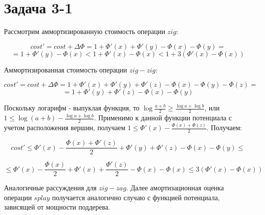 \documentclass{article}
\renewcommand{\leq}{\leqslant}  %
\renewcommand{\geq}{\geqslant}  %
\begin{document}
\section{Задача 3-1}

Рассмотрим аммортизированную стоимость операции $zig$:

$$cost' = cost + \Delta \Phi = 1 + \Phi'(x) + \Phi'(y) - \Phi(x) - \Phi(y)=$$
$$ = 1 + \Phi'(y) - \Phi(x) < 1 + \Phi'(x) - \Phi(x) < 1 + 3(\Phi'(x) - \Phi(x))$$

Аммортизированная стоимость операции $zig-zig$:

$$cost' = cost + \Delta \Phi = 1 + \Phi'(x) + \Phi'(y) + \Phi'(z) - \Phi(x) - \Phi(y) - \Phi(z)=$$
$$ =1 + \Phi'(y) + \Phi'(z) - \Phi(x) - \Phi(y)$$

Поскольку логарифм - выпуклая функция, то $\log\frac{a+b}{2} \geq \frac{\log a + \log b}{2} $, или $1 \leq \log (a+b) - \frac{\log a + \log b}{2}$. Применимо к данной функции потенциала с учетом расположения вершин, получаем $1 \leq \Phi'(x) - \frac{\Phi(x) + \Phi(z)}{2}$. Получаем:

$$cost' \leq \Phi'(x) - \frac{\Phi(x) + \Phi'(z)}{2} + \Phi'(y) + \Phi'(z) - \Phi(x) - \Phi(y) \leq $$

$$\leq \Phi'(x) - \frac{\Phi(x)}{2} + \Phi'(x) + \frac{\Phi'(z)}{2} - \Phi(x) - \Phi(x) \leq 3(\Phi'(x) - \Phi(x)) $$

Аналогичные рассуждения для $zig-zag$. Далее амортизационная оценка операции $splay$ получается аналогично случаю с функцией потенциала, зависящей от мощности поддерева.
\end{document}
